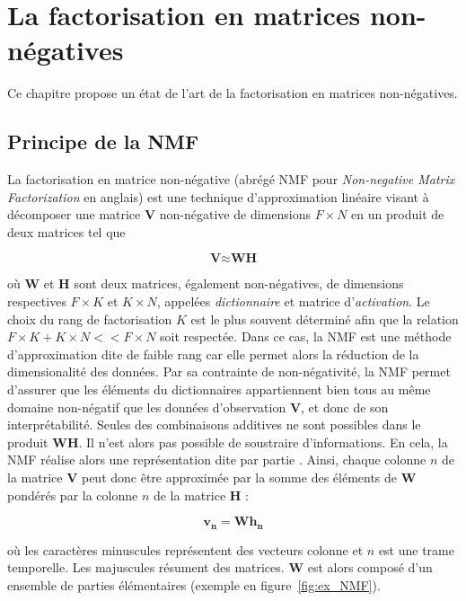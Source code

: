 %
%
%

%
\chapter{La factorisation en matrices non-négatives}
Ce chapitre propose un état de l'art de la factorisation en matrices non-négatives. 

\section{Principe de la NMF}
La factorisation en matrice non-négative (abrégé NMF pour \textit{Non-negative Matrix Factorization} en anglais) est une technique d'approximation linéaire visant à décomposer une matrice $\textbf{V}$ non-négative de dimensions $F \times N$ en un produit de deux matrices tel que

\begin{equation}
\textbf{V} \approx \textbf{WH}
\end{equation}

où $\textbf{W}$ et $\textbf{H}$ sont deux matrices, également non-négatives, de dimensions respectives $F \times K$ et $K \times N$, appelées \textit{dictionnaire} et matrice d'\textit{activation}. Le choix du rang de factorisation $K$ est le plus souvent déterminé afin que la relation $F \times K + K \times N << F \times N$ soit respectée. Dans ce cas, la NMF est une méthode d'approximation dite de faible rang car elle permet alors la réduction de la dimensionalité des données. Par sa contrainte de non-négativité, la NMF permet d'assurer que les éléments du dictionnaires appartiennent bien tous au même domaine non-négatif que les données d'observation $\mathbf{V}$, et donc de son interprétabilité. Seules des combinaisons additives ne sont possibles dans le produit $\mathbf{WH}$. Il n'est alors pas possible de soustraire d'informations. En cela, la NMF réalise alors une représentation dite \og par partie \fg{}. Ainsi, chaque colonne $n$ de la matrice $\mathbf{V}$ peut donc être approximée par la somme des éléments de $\mathbf{W}$ pondérés par la colonne $n$ de la matrice $\mathbf{H}$ : 

\begin{equation}
\mathbf{v_n} = \mathbf{Wh_n}
\end{equation}

où les caractères minuscules représentent des vecteurs colonne et $n$ est une trame temporelle. Les majuscules résument des matrices. $\mathbf{W}$ est alors composé d'un ensemble de parties élémentaires (exemple en figure~\ref{fig:ex_NMF}). 

